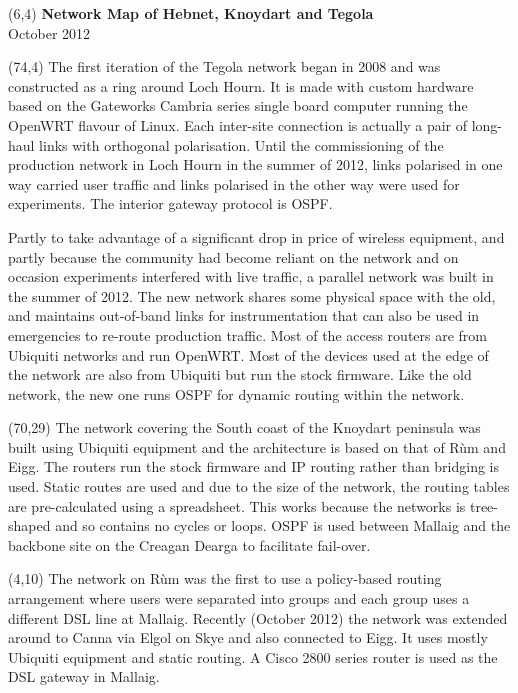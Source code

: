 \documentclass[noborder,onecolumn]{netmap}
\begin{document}
\begin{textblock}{32}(6,4)
  \textbf{\fontsize{60}{80}\selectfont
    Network Map of Hebnet, Knoydart and Tegola}\\
  {\Huge October 2012}
\end{textblock}
\begin{textblock}{10}(74,4)
  \linespread{1.0}
  \scriptsize
  The first iteration of the Tegola network began in 2008 and was
    constructed as a ring around Loch Hourn. It is made with custom
    hardware based on the Gateworks Cambria series single board computer
    running the OpenWRT flavour of Linux. Each inter-site connection is
    actually a pair of long-haul links with orthogonal polarisation. Until
    the commissioning of the production network in Loch Hourn in the
    summer of 2012, links polarised in one way carried user traffic and
    links polarised in the other way were used for experiments. The
    interior gateway protocol is OSPF.

    Partly to take advantage of a significant drop in price of
    wireless equipment, and partly because the community had become
    reliant on the network and on occasion experiments
    interfered with live traffic, a parallel network was built in the
    summer of 2012. The new network shares some physical space with the
    old, and maintains out-of-band links for instrumentation that can also
    be used in emergencies to re-route production traffic. Most of the
    access routers are from Ubiquiti networks and run OpenWRT. Most of the
    devices used at the edge of the network are also from Ubiquiti but run
    the stock firmware.  Like the old network, the new one runs OSPF for
    dynamic routing within the network.
\end{textblock}
\begin{textblock}{14}(70,29)
  \linespread{1.0}
  \scriptsize
  The network covering the South coast of the Knoydart peninsula was
  built using Ubiquiti equipment and the architecture is based on that
  of Rùm and Eigg. The routers run the stock firmware and IP routing
  rather than bridging is used. Static routes are used and due to the
  size of the network, the routing tables are pre-calculated using a
  spreadsheet. This works because the networks is tree-shaped and so
  contains no cycles or loops. OSPF is used between Mallaig and the
  backbone site on the Creagan Dearga to facilitate fail-over.
\end{textblock}
\begin{textblock}{12}(4,10)
  \linespread{1.0}
  \scriptsize
  The network on R\`um was the first to use a policy-based routing
  arrangement where users were separated into groups and each group uses
  a different DSL line at Mallaig. Recently (October 2012) the network
  was extended around to Canna via Elgol on Skye and also connected to
  Eigg. It uses mostly Ubiquiti equipment and static routing. A Cisco
  2800 series router is used as the DSL gateway in Mallaig.
\end{textblock}
\end{document}
